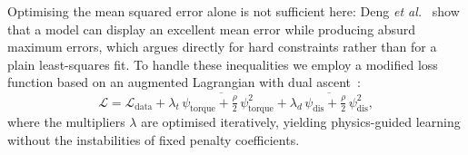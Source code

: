 \documentclass[a4paper, oneside]{article}
\begin{document}
Optimising the mean squared error alone is not sufficient here: Deng \emph{et al.}~\cite{deng2024} show that a model can display an excellent mean error while producing absurd maximum errors, which argues directly for hard constraints rather than for a plain least-squares fit. To handle these inequalities we employ a modified loss function based on an augmented Lagrangian with dual ascent~\cite{djeumou2022}:
%
\begin{equation}
    \mathcal{L} = \mathcal{L}_{\mathrm{data}} + \overline{\lambda_{t}\,\psi_{\mathrm{torque}} + \tfrac{\rho}{2}\,\psi_{\mathrm{torque}}^{2}} + \overline{\lambda_{d}\,\psi_{\mathrm{dis}} + \tfrac{\rho}{2}\,\psi_{\mathrm{dis}}^{2}} ,
    \label{eq-Ltotal}
\end{equation}
%
where the multipliers $\lambda$ are optimised iteratively, yielding physics-guided learning without the instabilities of fixed penalty coefficients.
\end{document}
